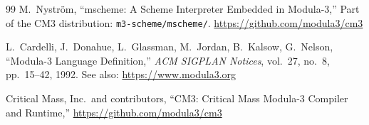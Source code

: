 \documentclass[11pt]{article}
\begin{document}
\begin{thebibliography}{99}
M.~Nystr\"om,
``mscheme: A Scheme Interpreter Embedded in Modula-3,''
Part of the CM3 distribution: \texttt{m3-scheme/mscheme/}.
\url{https://github.com/modula3/cm3}

L.~Cardelli, J.~Donahue, L.~Glassman, M.~Jordan, B.~Kalsow, G.~Nelson,
``Modula-3 Language Definition,''
\emph{ACM SIGPLAN Notices}, vol.~27, no.~8, pp.~15--42, 1992.
See also: \url{https://www.modula3.org}

Critical Mass, Inc.\ and contributors,
``CM3: Critical Mass Modula-3 Compiler and Runtime,''
\url{https://github.com/modula3/cm3}

\end{thebibliography}
\end{document}
